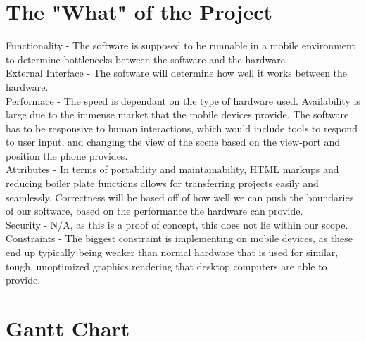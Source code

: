 \documentclass[letterpaper,10pt,titlepage,draftclsnofoot,onecolumn,compsoc,utf8,latin1]{IEEEtran}
\begin{document}
\section{The "What" of the Project}
\begin{singlespace}
Functionality - The software is supposed to be runnable in a mobile environment to determine bottlenecks between the software and the hardware.\\

\noindent
External Interface - The software will determine how well it works between the hardware.\\

\noindent
Performace - The speed is dependant on the type of hardware used.
Availability is large due to the immense market that the mobile devices provide. The software has to be responsive to human interactions, which would include tools to respond to user input, and changing the view of the scene based on the view-port and position the phone provides.\\


\noindent
Attributes - In terms of portability and maintainability, HTML markups and reducing boiler plate functions allows for transferring projects easily and seamlessly.
Correctness will be based off of how well we can push the boundaries of our software, based on the performance the hardware can provide.\\

\noindent
Security - N/A, as this is a proof of concept, this does not lie within our scope.\\

\noindent
Constraints - The biggest constraint is implementing on mobile devices, as these end up typically being weaker than normal hardware that is used for similar, tough, unoptimized graphics rendering that desktop computers are able to provide.
\end{singlespace}

\section{Gantt Chart}



    
\end{document}
